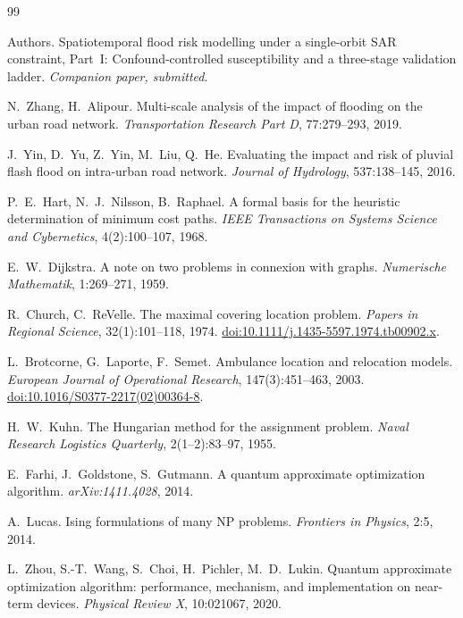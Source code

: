 \documentclass[journal]{IEEEtran}
\begin{document}
\balance
\begin{thebibliography}{99}
\setlength{\itemsep}{1pt}

 Authors. Spatiotemporal flood risk modelling under a single-orbit SAR constraint, Part~I: Confound-controlled susceptibility and a three-stage validation ladder. \emph{Companion paper, submitted}.

N.~Zhang, H.~Alipour.
Multi-scale analysis of the impact of flooding on the urban road network.
\emph{Transportation Research Part D}, 77:279--293, 2019.

J.~Yin, D.~Yu, Z.~Yin, M.~Liu, Q.~He.
Evaluating the impact and risk of pluvial flash flood on intra-urban road network.
\emph{Journal of Hydrology}, 537:138--145, 2016.

P.~E.~Hart, N.~J.~Nilsson, B.~Raphael.
A formal basis for the heuristic determination of minimum cost paths.
\emph{IEEE Transactions on Systems Science and Cybernetics}, 4(2):100--107, 1968.

E.~W.~Dijkstra.
A note on two problems in connexion with graphs.
\emph{Numerische Mathematik}, 1:269--271, 1959.

R.~Church, C.~ReVelle.
The maximal covering location problem.
\emph{Papers in Regional Science}, 32(1):101--118, 1974.
\href{https://doi.org/10.1111/j.1435-5597.1974.tb00902.x}{doi:10.1111/j.1435-5597.1974.tb00902.x}.

L.~Brotcorne, G.~Laporte, F.~Semet.
Ambulance location and relocation models.
\emph{European Journal of Operational Research}, 147(3):451--463, 2003.
\href{https://doi.org/10.1016/S0377-2217(02)00364-8}{doi:10.1016/S0377-2217(02)00364-8}.

H.~W.~Kuhn.
The Hungarian method for the assignment problem.
\emph{Naval Research Logistics Quarterly}, 2(1--2):83--97, 1955.

E.~Farhi, J.~Goldstone, S.~Gutmann.
A quantum approximate optimization algorithm.
\emph{arXiv:1411.4028}, 2014.

A.~Lucas. Ising formulations of many NP problems.
\emph{Frontiers in Physics}, 2:5, 2014.

L.~Zhou, S.-T.~Wang, S.~Choi, H.~Pichler, M.~D.~Lukin.
Quantum approximate optimization algorithm: performance, mechanism, and
implementation on near-term devices.
\emph{Physical Review X}, 10:021067, 2020.


\end{thebibliography}
\end{document}
